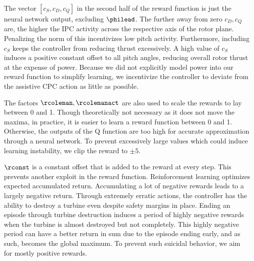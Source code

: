 The vector $[c_S, c_D, c_Q]$ in the second half of the reward function is just the neural network output, excluding $\philead$. The further away from zero $c_D, c_Q$ are, the higher the IPC activity across the respective axis of the rotor plane. Penalizing the norm of this incentivizes low pitch activity. Furthermore, including $c_S$ keeps the controller from reducing thrust excessively. A high value of $c_S$ induces a positive constant offset to all pitch angles, reducing overall rotor thrust at the expense of power. Because we did not explicitly model power into our reward function to simplify learning, we incentivize the controller to deviate from the assistive CPC action as little as possible.

The factors $\rcoleman, \rcolemanact$ are also used to scale the rewards to lay between 0 and 1. Though theoretically not necessary as it does not move the maxima, in practice, it is easier to learn a reward function between 0 and 1. Otherwise, the outputs of the Q function are too high for accurate approximation through a neural network. To prevent excessively large values which could induce learning instability, we clip the reward to $\pm 5$. 

$\rconst$ is a constant offset that is added to the reward at every step. This prevents another exploit in the reward function. Reinforcement learning optimizes expected accumulated return. Accumulating a lot of negative rewards leads to a largely negative return. Through extremely erratic actions, the controller has the ability to destroy a turbine even despite safety margins in place. Ending an episode through turbine destruction induces a period of highly negative rewards when the turbine is almost destroyed but not completely. This highly negative period can have a better return in sum due to the episode ending early, and as such, becomes the global maximum. To prevent such suicidal behavior, we aim for mostly positive rewards.

